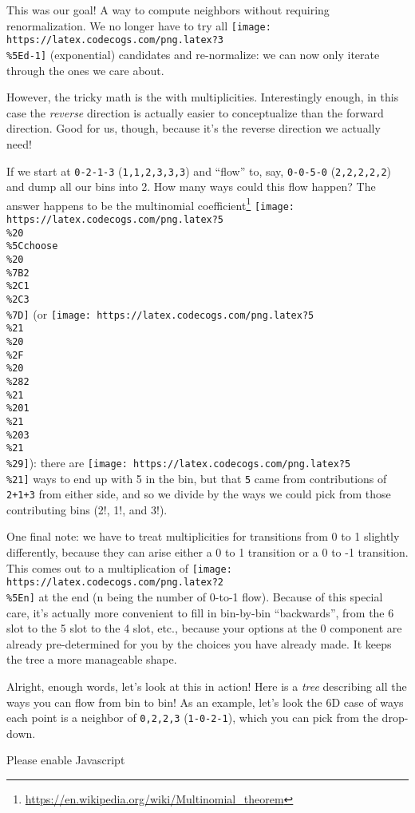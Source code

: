 \documentclass[]{article}
\renewcommand{\href}[2]{#2\footnote{\url{#1}}}
\begin{document}
This was our goal! A way to compute neighbors without requiring renormalization.
We no longer have to try all
\texttt{[image: https://latex.codecogs.com/png.latex?3\\\%5Ed-1]} (exponential)
candidates and re-normalize: we can now only iterate through the ones we care
about.

However, the tricky math is the with multiplicities. Interestingly enough, in
this case the \emph{reverse} direction is actually easier to conceptualize than
the forward direction. Good for us, though, because it's the reverse direction
we actually need!

If we start at \texttt{0-2-1-3} (\texttt{1,1,2,3,3,3}) and ``flow'' to, say,
\texttt{0-0-5-0} (\texttt{2,2,2,2,2}) and dump all our bins into 2. How many
ways could this flow happen? The answer happens to be the
\href{https://en.wikipedia.org/wiki/Multinomial_theorem}{multinomial
coefficient}
\texttt{[image: https://latex.codecogs.com/png.latex?5\\\%20\\\%5Cchoose\\\%20\\\%7B2\\\%2C1\\\%2C3\\\%7D]}
(or
\texttt{[image: https://latex.codecogs.com/png.latex?5\\\%21\\\%20\\\%2F\\\%20\\\%282\\\%21\\\%201\\\%21\\\%203\\\%21\\\%29]}):
there are \texttt{[image: https://latex.codecogs.com/png.latex?5\\\%21]} ways to
end up with 5 in the bin, but that \texttt{5} came from contributions of
\texttt{2+1+3} from either side, and so we divide by the ways we could pick from
those contributing bins (2!, 1!, and 3!).

One final note: we have to treat multiplicities for transitions from 0 to 1
slightly differently, because they can arise either a 0 to 1 transition or a 0
to -1 transition. This comes out to a multiplication of
\texttt{[image: https://latex.codecogs.com/png.latex?2\\\%5En]} at the end (n
being the number of 0-to-1 flow). Because of this special care, it's actually
more convenient to fill in bin-by-bin ``backwards'', from the 6 slot to the 5
slot to the 4 slot, etc., because your options at the 0 component are already
pre-determined for you by the choices you have already made. It keeps the tree a
more manageable shape.

Alright, enough words, let's look at this in action! Here is a \emph{tree}
describing all the ways you can flow from bin to bin! As an example, let's look
the 6D case of ways each point is a neighbor of \texttt{0,2,2,3}
(\texttt{1-0-2-1}), which you can pick from the drop-down.

\leavevmode\hypertarget{golTreeReverse}{}%
Please enable Javascript
\end{document}
